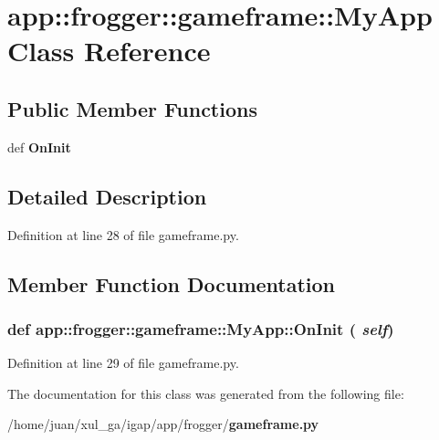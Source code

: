 \section{app::frogger::gameframe::MyApp Class Reference}
\label{classapp_1_1frogger_1_1gameframe_1_1MyApp}
\subsection*{Public Member Functions}
\begin{CompactItemize}
\item 
def {\bf OnInit}
\end{CompactItemize}


\subsection{Detailed Description}


Definition at line 28 of file gameframe.py.

\subsection{Member Function Documentation}
\subsubsection{\setlength{\rightskip}{0pt plus 5cm}def app::frogger::gameframe::MyApp::OnInit ( {\em self})}\label{classapp_1_1frogger_1_1gameframe_1_1MyApp_5f6d81d80efd12cd87c34dd596eac665}




Definition at line 29 of file gameframe.py.

The documentation for this class was generated from the following file:\begin{CompactItemize}
\item 
/home/juan/xul\_\-ga/igap/app/frogger/{\bf gameframe.py}\end{CompactItemize}
